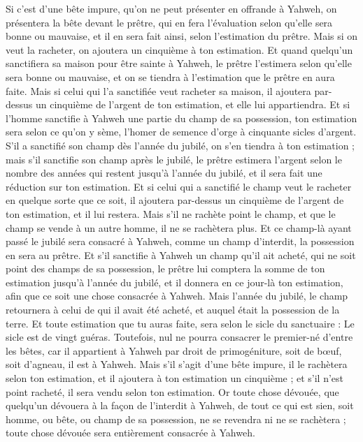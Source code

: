 \begin{multicols}{2}
Si c'est d'une bête impure, qu'on ne peut présenter en offrande à Yahweh, on présentera la bête devant le prêtre,
qui en fera l'évaluation selon qu'elle sera bonne ou mauvaise, et il en sera fait ainsi, selon l'estimation du prêtre.
Mais si on veut la racheter, on ajoutera un cinquième à ton estimation.
Et quand quelqu'un sanctifiera sa maison pour être sainte à Yahweh, le prêtre l'estimera selon qu'elle sera bonne ou mauvaise, et on se tiendra à l'estimation que le prêtre en aura faite.
Mais si celui qui l'a sanctifiée veut racheter sa maison, il ajoutera par-dessus un cinquième de l'argent de ton estimation, et elle lui appartiendra.
Et si l'homme sanctifie à Yahweh une partie du champ de sa possession, ton estimation sera selon ce qu'on y sème, l'homer de semence d'orge à cinquante sicles d'argent.
S'il a sanctifié son champ dès l'année du jubilé, on s'en tiendra à ton estimation ;
mais s'il sanctifie son champ après le jubilé, le prêtre estimera l'argent selon le nombre des années qui restent jusqu'à l'année du jubilé, et il sera fait une réduction sur ton estimation.
Et si celui qui a sanctifié le champ veut le racheter en quelque sorte que ce soit, il ajoutera par-dessus un cinquième de l'argent de ton estimation, et il lui restera.
Mais s'il ne rachète point le champ, et que le champ se vende à un autre homme, il ne se rachètera plus.
Et ce champ-là ayant passé le jubilé sera consacré à Yahweh, comme un champ d'interdit, la possession en sera au prêtre.
Et s'il sanctifie à Yahweh un champ qu'il ait acheté, qui ne soit point des champs de sa possession,
le prêtre lui comptera la somme de ton estimation jusqu'à l'année du jubilé, et il donnera en ce jour-là ton estimation, afin que ce soit une chose consacrée à Yahweh.
Mais l'année du jubilé, le champ retournera à celui de qui il avait été acheté, et auquel était la possession de la terre.
Et toute estimation que tu auras faite, sera selon le sicle du sanctuaire : Le sicle est de vingt guéras.
Toutefois, nul ne pourra consacrer le premier-né d'entre les bêtes, car il appartient à Yahweh par droit de primogéniture, soit de bœuf, soit d'agneau, il est à Yahweh.
Mais s'il s'agit d'une bête impure, il le rachètera selon ton estimation, et il ajoutera à ton estimation un cinquième ; et s'il n'est point racheté, il sera vendu selon ton estimation.
Or toute chose dévouée, que quelqu'un dévouera à la façon de l'interdit à Yahweh, de tout ce qui est sien, soit homme, ou bête, ou champ de sa possession, ne se revendra ni ne se rachètera ; toute chose dévouée sera entièrement consacrée à Yahweh.

\end{multicols}
